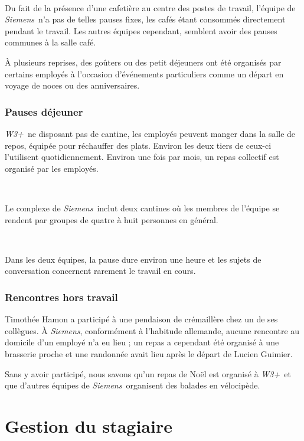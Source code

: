 \documentclass[a4paper, oneside, 12pt]{article}
\def\www{\emph{W3+}}
\def\siemens{\emph{Siemens}}
\begin{document}
\ 

Du fait de la présence d’une cafetière au centre des postes de travail, l’équipe de \siemens\ n’a pas de telles pauses fixes, les cafés étant consommés directement pendant le travail. Les autres équipes cependant, semblent avoir des pauses communes à la salle café.

À plusieurs reprises, des goûters ou des petit déjeuners ont été organisés par certains employés à l’occasion d’événements particuliers comme un départ en voyage de noces ou des anniversaires.

\vfill

\newpage

\subsubsection{Pauses déjeuner}

\www\ ne disposant pas de cantine, les employés peuvent manger dans la salle de repos, équipée pour réchauffer des plats. Environ les deux tiers de ceux-ci l’utilisent quotidiennement. Environ une fois par mois, un repas collectif est organisé par les employés.

\ 

Le complexe de \siemens\ inclut deux cantines où les membres de l’équipe se rendent par groupes de quatre à huit personnes en général.

\ 

Dans les deux équipes, la pause dure environ une heure et les sujets de conversation concernent rarement le travail en cours.

\subsubsection{Rencontres hors travail}

Timothée {\sc Hamon} a participé à une pendaison de crémaillère chez un de ses collègues. À \siemens, conformément à l’habitude allemande, aucune rencontre au domicile d’un employé n’a eu lieu ; un repas a cependant été organisé à une brasserie proche et une randonnée avait lieu après le départ de Lucien {\sc Guimier}.

Sans y avoir participé, nous savons qu’un repas de Noël est organisé à \www\ et que d’autres équipes de \siemens\ organisent des balades en vélocipède.

\vfill

\section{Gestion du stagiaire}
\end{document}
